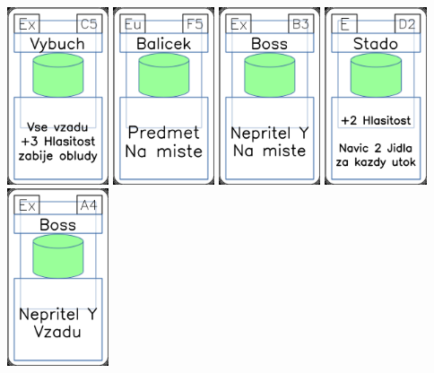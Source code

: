 \documentclass[a4paper]{article}
\begin{document}
	\includegraphics[width=3.0cm]{img-4_14}
	\includegraphics[width=3.0cm]{img-4_29}
	\includegraphics[width=3.0cm]{img-4_7}
	\includegraphics[width=3.0cm]{img-4_46}
	\includegraphics[width=3.0cm]{img-4_3}
\end{document}
